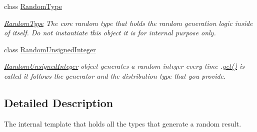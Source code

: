 \begin{DoxyCompactItemize}
class \mbox{\hyperlink{classtestcaser_1_1maker_1_1types_1_1RandomType}{Random\+Type}}
\begin{DoxyCompactList}\small\item\em \mbox{\hyperlink{classtestcaser_1_1maker_1_1types_1_1RandomType}{Random\+Type}} The core random type that holds the random generation logic inside of itself. Do not instantiate this object it is for internal purpose only. \end{DoxyCompactList}\item 
class \mbox{\hyperlink{classtestcaser_1_1maker_1_1types_1_1RandomUnsignedInteger}{Random\+Unsigned\+Integer}}
\begin{DoxyCompactList}\small\item\em \mbox{\hyperlink{classtestcaser_1_1maker_1_1types_1_1RandomUnsignedInteger}{Random\+Unsigned\+Integer}} object generates a random integer every time .\mbox{\hyperlink{classtestcaser_1_1maker_1_1types_1_1RandomUnsignedInteger_a73504939f740445d56b0bd00257f5480}{get()}} is called it follows the generator and the distribution type that you provide. \end{DoxyCompactList}\end{DoxyCompactItemize}


\subsection{Detailed Description}
The internal template that holds all the types that generate a random result. 


